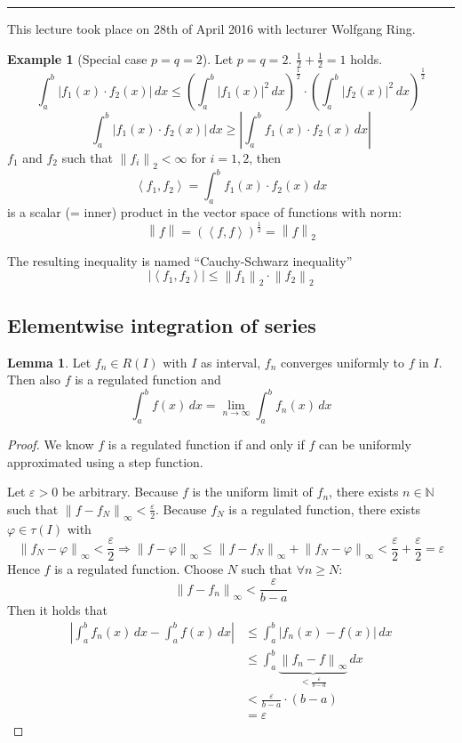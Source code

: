 \documentclass[a4paper,landscape,twocolumn]{article}
\theoremstyle{definition}
\newtheorem{ex}{Example}
\newtheorem{lemma}{Lemma}
\newcommand\abs[1]{\left|#1\right|}
\newcommand\meta[3]{\hrule{} This #1 took place on #2 with lecturer #3.\par}
\newcommand\norm[1]{\left\|#1\right\|}
\newcommand\inorm[1]{\left\|#1\right\|_\infty}
\newcommand\fun[1]{\left\langle{#1}\right\rangle}
\begin{document}
\meta{lecture}{28th of April 2016}{Wolfgang Ring}

\begin{ex}[Special case $p = q = 2$]
  Let $p = q = 2$. $\frac12 + \frac12 = 1$ holds.
  \[
    \int_a^b \abs{f_1(x) \cdot f_2(x)} \, dx
    \leq \left(\int_a^b \abs{f_1(x)}^2 \, dx\right)^{\frac12}
    \cdot \left(\int_a^b \abs{f_2(x)}^2 \, dx\right)^{\frac12}
  \] \[
    \int_a^b \abs{f_1(x) \cdot f_2(x)} \, dx \geq \abs{\int_a^b f_1(x) \cdot f_2(x) \, dx}
  \]
  $f_1$ and $f_2$ such that $\norm{f_i}_2 < \infty$ for $i = 1,2$,
  then
  \[ \fun{f_1, f_2} = \int_a^b f_1(x) \cdot f_2(x) \, dx \]
  is a scalar (= inner) product in the vector space of functions
  with norm:
  \[
    \norm{f} = (\fun{f, f})^{\frac12} = \norm{f}_2
  \]
\end{ex}

The resulting inequality is named \enquote{Cauchy-Schwarz inequality}
\[
  \abs{\fun{f_1, f_2}} \leq \norm{f_1}_2 \cdot \norm{f_2}_2
\]

\subsection{Elementwise integration of series}
%
\begin{lemma}
  Let $f_n \in R(I)$ with $I$ as interval, $f_n$ converges uniformly to $f$ in $I$.
  Then also $f$ is a regulated function and
  \[ \int_a^b f(x) \, dx = \lim_{n\to\infty} \int_a^b f_n(x) \, dx \]
\end{lemma}
\begin{proof}
  We know $f$ is a regulated function if and only if $f$ can be uniformly
  approximated using a step function.

  Let $\varepsilon > 0$ be arbitrary.
  Because $f$ is the uniform limit of $f_n$, there exists $n \in \mathbb N$
  such that $\inorm{f - f_N} < \frac\varepsilon2$. Because $f_N$ is a regulated
  function, there exists $\varphi \in \tau(I)$ with
  \[
    \inorm{f_N - \varphi} < \frac\varepsilon2 \Rightarrow
    \inorm{f - \varphi} \leq \inorm{f - f_N} + \inorm{f_N - \varphi}
    < \frac\varepsilon2 + \frac\varepsilon2 = \varepsilon
  \]
  Hence $f$ is a regulated function.
  Choose $N$ such that $\forall n \geq N$:
  \[ \inorm{f - f_n} < \frac\varepsilon{b - a} \]
  Then it holds that
  \begin{align*}
    \abs{\int_a^b f_n(x) \, dx - \int_a^b f(x) \, dx}
      &\leq \int_a^b \abs{f_n(x) - f(x)} \, dx \\
      &\leq \int_a^b \underbrace{\inorm{f_n - f}}_{< \frac\varepsilon{b - a}} \, dx \\
      &< \frac\varepsilon{b - a} \cdot (b - a) \\
      &= \varepsilon
  \end{align*}
\end{proof}
\end{document}
